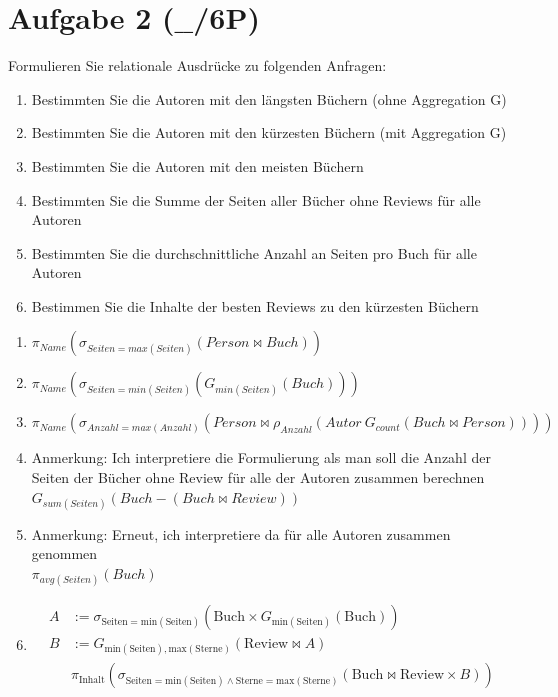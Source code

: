 \documentclass{article}
\begin{document}
\section*{Aufgabe 2 ($\_\_$/6P)}
Formulieren Sie relationale Ausdrücke zu folgenden Anfragen:
\begin{enumerate}
    \item Bestimmten Sie die Autoren mit den längsten Büchern (ohne Aggregation G)
    \item Bestimmten Sie die Autoren mit den kürzesten Büchern (mit Aggregation G)
    \item Bestimmten Sie die Autoren mit den meisten Büchern
    \item Bestimmten Sie die Summe der Seiten aller Bücher ohne Reviews für alle Autoren
    \item Bestimmten Sie die durchschnittliche Anzahl an Seiten pro Buch für alle Autoren
    \item Bestimmen Sie die Inhalte der besten Reviews zu den kürzesten Büchern
\end{enumerate}
\begin{mybox}
\begin{enumerate}
    \item \( \pi_{Name}(\sigma_{Seiten=max(Seiten)}(Person \bowtie Buch)) \) 
    \item \(\pi_{Name}(\sigma_{Seiten=min(Seiten)}(G_{min(Seiten)}(Buch)))\)
    \item \(\pi_{Name}(\sigma_{Anzahl = max(Anzahl)}(Person \bowtie \rho_{Anzahl}(Autor\ G_{count}(Buch \bowtie Person))))\)
    \item Anmerkung: Ich interpretiere die Formulierung als man soll die Anzahl der Seiten der Bücher ohne Review für alle der Autoren zusammen berechnen \\
    \(G_{sum(Seiten)}(Buch - (Buch \bowtie Review))\)
    \item Anmerkung: Erneut, ich interpretiere da für alle Autoren zusammen genommen \\
    \( \pi_{avg(Seiten)}(Buch) \)
    \item 
  \[  \begin{aligned}
A &:= \sigma_{\text{Seiten} = \text{min}(\text{Seiten})}(\text{Buch} \times G_{\text{min}(\text{Seiten})}(\text{Buch})) \\
B &:= G_{\text{min}(\text{Seiten}), \text{max}(\text{Sterne})}(\text{Review} \bowtie A) \\
&\pi_{\text{Inhalt}}(\sigma_{\text{Seiten} = \text{min}(\text{Seiten}) \wedge \text{Sterne} = \text{max}(\text{Sterne})}(\text{Buch} \bowtie \text{Review} \times B))
\end{aligned}\]
\end{enumerate}
\end{mybox}
\end{document}
